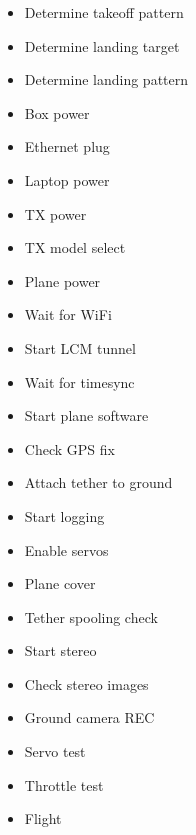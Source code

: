 \documentclass[12pt]{article}
\author{Andy Barry}
\title{}
\begin{document}
\thispagestyle{empty} %
\pagestyle{empty} %

\begin{itemize}
    \item Determine takeoff pattern
    \item Determine landing target
    \item Determine landing pattern
    \item Box power
    \item Ethernet plug
    \item Laptop power
    \item TX power
    \item TX model select
    \item Plane power
    \item Wait for WiFi
    \item Start LCM tunnel
    \item Wait for timesync
    \item Start plane software
    \item Check GPS fix
    \item Attach tether to ground
    \item Start logging
    \item Enable servos
    \item Plane cover
    \item Tether spooling check
    \item Start stereo
    \item Check stereo images
    \item Ground camera REC
    \item Servo test
    \item Throttle test
    \item Flight

\end{itemize}








%

\end{document}
